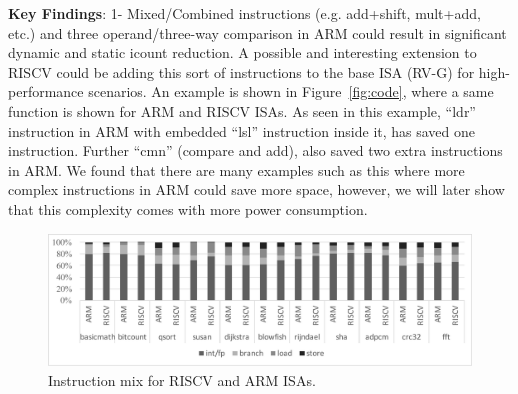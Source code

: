\noindent \textbf{Key Findings}: 1- Mixed/Combined instructions (e.g. add+shift, mult+add, etc.) and three operand/three-way comparison in ARM could result in significant dynamic and static icount reduction. A possible and interesting extension to RISCV could be adding this sort of instructions to the base ISA (RV-G) for high-performance scenarios. An example is shown in Figure~\ref{fig:code}, where a same function is shown for ARM and RISCV ISAs. As seen in this example, ``ldr'' instruction in ARM with embedded ``lsl'' instruction inside it, has saved one instruction. Further ``cmn'' (compare and add), also saved two extra instructions in ARM. We found that there are many examples such as this where more complex instructions in ARM could save more space, however, we will later show that this complexity comes with more power consumption. 

\begin{figure}[t]
	\centering
	\includegraphics[width=1.9\columnwidth]{figures/mix.pdf}
	\caption{Instruction mix for RISCV and ARM ISAs.}
	\label{fig:mix}
	\vspace{-1em}
\end{figure} 

